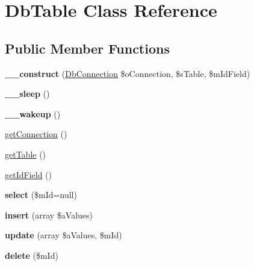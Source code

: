 \hypertarget{class_db_table}{\section{Db\-Table Class Reference}
\label{class_db_table}
}
\subsection*{Public Member Functions}
\begin{DoxyCompactItemize}
\item 
\hypertarget{class_db_table_a94371456c4534ead51db2407a795bb1a}{{\bfseries \-\_\-\-\_\-construct} (\hyperlink{class_db_connection}{Db\-Connection} \$o\-Connection, \$s\-Table, \$m\-Id\-Field)}\label{class_db_table_a94371456c4534ead51db2407a795bb1a}

\item 
\hypertarget{class_db_table_a706c99e14a289130642f704fa5547c7b}{{\bfseries \-\_\-\-\_\-sleep} ()}\label{class_db_table_a706c99e14a289130642f704fa5547c7b}

\item 
\hypertarget{class_db_table_a936df05d6902ba7acf350403b694f127}{{\bfseries \-\_\-\-\_\-wakeup} ()}\label{class_db_table_a936df05d6902ba7acf350403b694f127}

\item 
\hyperlink{class_db_table_a5fbb264a4424d8450832fedc9b862bbc}{get\-Connection} ()
\item 
\hyperlink{class_db_table_a0fc18d6ecd6b2189d5ed239f19e08129}{get\-Table} ()
\item 
\hyperlink{class_db_table_ab1c8088aa73836eb9e5780ad734934fb}{get\-Id\-Field} ()
\item 
\hypertarget{class_db_table_a666358814afddcbcb066f1ab68c3aa21}{{\bfseries select} (\$m\-Id=null)}\label{class_db_table_a666358814afddcbcb066f1ab68c3aa21}

\item 
\hypertarget{class_db_table_a1eed96d0b9b1a798ab66eac6ec3576ba}{{\bfseries insert} (array \$a\-Values)}\label{class_db_table_a1eed96d0b9b1a798ab66eac6ec3576ba}

\item 
\hypertarget{class_db_table_a21f44661231cd5775cb27496bbffb76f}{{\bfseries update} (array \$a\-Values, \$m\-Id)}\label{class_db_table_a21f44661231cd5775cb27496bbffb76f}

\item 
\hypertarget{class_db_table_ab1bf8c90e6289e18d065f041f7e6c4c7}{{\bfseries delete} (\$m\-Id)}\label{class_db_table_ab1bf8c90e6289e18d065f041f7e6c4c7}

\end{DoxyCompactItemize}



